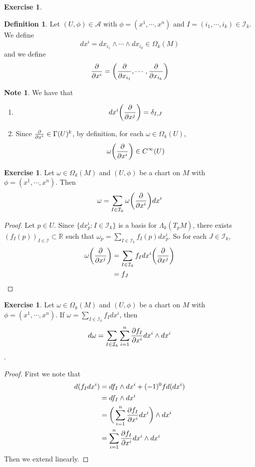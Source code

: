 \documentclass[12pt]{amsart}
\theoremstyle{definition}
\newtheorem{defn}[definition]{Definition}
\newtheorem{note}[definition]{Note}
\newtheorem{ex}[definition]{Exercise}
\newcommand{\Gam}{\Gamma}
\newcommand{\del}{\delta}
\newcommand{\Lam}{\Lambda}
\newcommand{\om}{\omega}
\newcommand{\Om}{\Omega}
\newcommand{\R}{\mathbb{R}}
\newcommand{\MA}{\mathcal{A}}
\newcommand{\MI}{\mathcal{I}}
\begin{document}
	\begin{ex}
	
	\end{ex}

	\begin{defn}
		Let $(U, \phi) \in \MA$ with $\phi = (x^1, \cdots, x^n)$ and $I = (i_1, \cdots, i_k) \in \MI_k$. We define $$dx^i = dx_{i_1} \wedge \cdots \wedge dx_{i_k} \in \Om_k(M)$$ 
		and we define $$\pdv{x^i}= \bigg(\pdv{x_{i_1}}, \cdots, \pdv{x_{i_k}} \bigg)$$

	\end{defn}
	
	\begin{note} We have that
	\begin{enumerate}
	\item  $$d x^i \bigg ( \pdv{x^j} \bigg) = \del_{I,J}$$
	\item Since $\pdv{x^i} \in \Gam(U)^k$, by definition, for each $\om \in \Om_k(U)$, $$\om \bigg(\pdv{x^i} \bigg) \in C^{\infty}(U)$$
	\end{enumerate}
	\end{note}

	\begin{ex}
		Let $\om \in \Om_k(M)$ and $(U, \phi)$ be a chart on $M$ with $\phi = (x^1, \cdots, x^n)$. Then $$\om = \sum_{I \in \MI_k}\om \bigg(\pdv{x^i} \bigg) dx^i$$
	\end{ex}

	\begin{proof}
		Let $p \in U$. Since $\{dx^i_p: I \in \MI_k\}$ is a basis for $\Lam_k(T_pM)$, there exists $(f_I(p))_{I \in \MI} \subset \R$ such that $\om_p = \sum\limits_{I \in \MI_k} f_I(p) dx^i_p$. So for each $J \in \MI_k$, 
		\begin{align*}
			\om\bigg (\pdv{x^j} \bigg ) 
			&= \sum\limits_{I \in \MI_k} f_I dx^i \bigg (\pdv{x^j} \bigg )  \\
			&= f_J
		\end{align*} 
	\end{proof}

	\begin{ex}
		Let $\om \in \Om_k(M)$ and $(U, \phi)$ be a chart on $M$ with $\phi = (x^1, \cdots, x^n)$. If $\om = \sum\limits_{I \in \MI_k}f_I dx^i$, then $$d \om  = \sum_{I \in \MI_k} \sum_{i =1}^n \pdv{f_I}{x^i} dx^i \wedge dx^i$$.
	\end{ex}

	\begin{proof}
		First we note that
		\begin{align*}
			d(f_I dx^i) 
			&= df_I \wedge dx^i + (-1)^0 f d(dx^i) \\
			&= df_I \wedge dx^i \\
			&= \bigg( \sum\limits_{i=1}^n \pdv{f_I}{x^i}dx^i  \bigg) \wedge dx^i \\
			&= \sum\limits_{i=1}^n {\pdv{f_I}{x^i}}dx^i \wedge dx^i \\
		\end{align*}
		Then we extend linearly.
	\end{proof}
	
\end{document}
